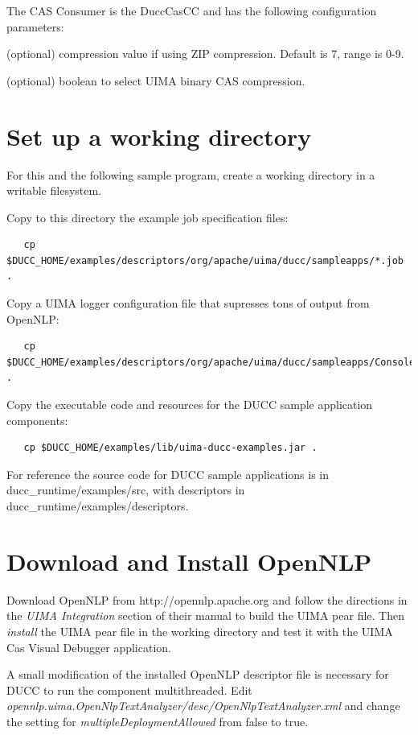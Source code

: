 The CAS Consumer is the DuccCasCC and has the following configuration parameters:

\begin{description}[labelindent=0.5in,leftmargin=0.5in]
  \item[XmiCompressionLevel] (optional) compression value if using ZIP compression. Default is 7, range is 0-9.
  \item[UseBinaryCompression] (optional) boolean to select UIMA binary CAS compression.
\end{description}

\section{Set up a working directory}
For this and the following sample program, create a working directory in a writable filesystem.

Copy to this directory the example job specification files:
\begin{verbatim}
   cp $DUCC_HOME/examples/descriptors/org/apache/uima/ducc/sampleapps/*.job .
\end{verbatim}

Copy a UIMA logger configuration file that supresses tons of output from OpenNLP:
\begin{verbatim}
   cp $DUCC_HOME/examples/descriptors/org/apache/uima/ducc/sampleapps/ConsoleLogger.properties .
\end{verbatim}

Copy the executable code and resources for the DUCC sample application components:
\begin{verbatim}
   cp $DUCC_HOME/examples/lib/uima-ducc-examples.jar .
\end{verbatim}

For reference the source code for DUCC sample applications is in ducc\_runtime/examples/src,
with descriptors in ducc\_runtime/examples/descriptors.

\section{Download and Install OpenNLP}
Download OpenNLP from http://opennlp.apache.org and follow the directions in the
{\em UIMA Integration} section of their manual to build the UIMA pear file.
Then {\em install} the UIMA pear file in the working directory and
test it with the UIMA Cas Visual Debugger application.

A small modification of the installed OpenNLP descriptor file
is necessary for DUCC to run the component multithreaded. 
Edit {\em opennlp.uima.OpenNlpTextAnalyzer/desc/OpenNlpTextAnalyzer.xml}
and change the setting for {\em multipleDeploymentAllowed} from false to true.

